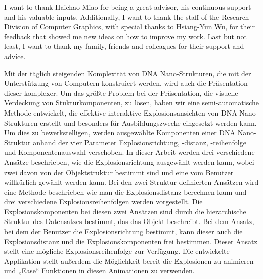\documentclass[draft,final]{vutinfth} %
\begin{document}
\frontmatter %

\addstatementpage

\begin{acknowledgements*}
I want to thank Haichao Miao for being a great advisor, his continuous support and his valuable inputs. Additionally, I want to thank the staff of the Research Division of Computer Graphics, with special thanks to Hsiang-Yun Wu, for their feedback that showed me new ideas on how to improve my work. Last but not least, I want to thank my family, friends and colleagues for their support and advice. 
\end{acknowledgements*}

\begin{kurzfassung}
Mit der täglich steigenden Komplexität von DNA Nano-Strukturen, die mit der Unterstützung von Computern konstruiert werden, wird auch die Präsentation dieser komplexer.
Um das größte Problem bei der Präsentation, die visuelle Verdeckung von Stukturkomponenten, zu lösen, haben wir eine semi-automatische Methode entwickelt, die effektive interaktive Explosionsansichten von DNA Nano-Strukturen erstellt und besonders für Ausbildungszwecke eingesetzt werden kann.
Um dies zu bewerkstelligen, werden ausgewählte Komponenten einer DNA Nano-Struktur anhand der vier Parameter Explosionsrichtung, -distanz, -reihenfolge und Komponentenauswahl verschoben. In dieser Arbeit werden drei verschiedene Ansätze beschrieben, wie die Explosionsrichtung ausgewählt werden kann, wobei zwei davon von der Objektstruktur bestimmt sind und eine vom Benutzer willkürlich gewählt werden kann. Bei den zwei Struktur definierten Ansätzen wird eine Methode beschrieben wie man die Explosionsdistanz berechnen kann und drei verschiedene Explosionsreihenfolgen werden vorgestellt. Die Explosionskomponenten bei diesen zwei Ansätzen sind durch die hierarchische Struktur des Datensatzes bestimmt, das das Objekt beschreibt. Bei dem Ansatz, bei dem der Benutzer die Explosionsrichtung bestimmt, kann dieser auch die Explosionsdistanz und die Explosionskomponenten frei bestimmen. Dieser Ansatz stellt eine mögliche Explosionsreihenfolge zur Verfügung. Die entwickelte Applikation stellt außerdem die Möglichkeit bereit die Explosionen zu animieren und „Ease“ Funktionen in diesen Animationen zu verwenden.
\end{kurzfassung}
\end{document}
